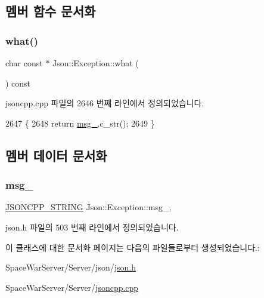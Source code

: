 \subsection{멤버 함수 문서화}
\mbox{\label{class_json_1_1_exception_a70b7ce35e761fb93e8cd338e04619cd6}} 
\subsubsection{\texorpdfstring{what()}{what()}}
{\footnotesize\ttfamily char const  $\ast$ Json\+::\+Exception\+::what (\begin{DoxyParamCaption}{ }\end{DoxyParamCaption}) const\hspace{0.3cm}{\ttfamily [inherited]}}



jsoncpp.\+cpp 파일의 2646 번째 라인에서 정의되었습니다.


\begin{DoxyCode}
2647 \{
2648   \textcolor{keywordflow}{return} \hyperlink{class_json_1_1_exception_aae3cbb8b45bf21480f64502a8329659f}{msg\_}.c\_str();
2649 \}
\end{DoxyCode}


\subsection{멤버 데이터 문서화}
\mbox{\label{class_json_1_1_exception_aae3cbb8b45bf21480f64502a8329659f}} 
\subsubsection{\texorpdfstring{msg\+\_\+}{msg\_}}
{\footnotesize\ttfamily \hyperlink{json_8h_a1e723f95759de062585bc4a8fd3fa4be}{J\+S\+O\+N\+C\+P\+P\+\_\+\+S\+T\+R\+I\+NG} Json\+::\+Exception\+::msg\+\_\+\hspace{0.3cm}{\ttfamily [protected]}, {\ttfamily [inherited]}}



json.\+h 파일의 503 번째 라인에서 정의되었습니다.



이 클래스에 대한 문서화 페이지는 다음의 파일들로부터 생성되었습니다.\+:\begin{DoxyCompactItemize}
\item 
Space\+War\+Server/\+Server/json/\hyperlink{json_8h}{json.\+h}\item 
Space\+War\+Server/\+Server/\hyperlink{jsoncpp_8cpp}{jsoncpp.\+cpp}\end{DoxyCompactItemize}
